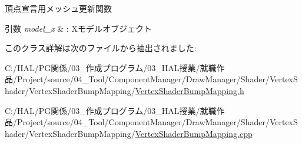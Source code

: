 頂点宣言用メッシュ更新関数 


\begin{DoxyParams}{引数}
{\em model\+\_\+x} & \+: Xモデルオブジェクト \\
\hline
\end{DoxyParams}


このクラス詳解は次のファイルから抽出されました\+:\begin{DoxyCompactItemize}
\item 
C\+:/\+H\+A\+L/\+P\+G関係/03\+\_\+作成プログラム/03\+\_\+\+H\+A\+L授業/就職作品/\+Project/source/04\+\_\+\+Tool/\+Component\+Manager/\+Draw\+Manager/\+Shader/\+Vertex\+Shader/\+Vertex\+Shader\+Bump\+Mapping/\mbox{\hyperlink{_vertex_shader_bump_mapping_8h}{Vertex\+Shader\+Bump\+Mapping.\+h}}\item 
C\+:/\+H\+A\+L/\+P\+G関係/03\+\_\+作成プログラム/03\+\_\+\+H\+A\+L授業/就職作品/\+Project/source/04\+\_\+\+Tool/\+Component\+Manager/\+Draw\+Manager/\+Shader/\+Vertex\+Shader/\+Vertex\+Shader\+Bump\+Mapping/\mbox{\hyperlink{_vertex_shader_bump_mapping_8cpp}{Vertex\+Shader\+Bump\+Mapping.\+cpp}}\end{DoxyCompactItemize}
